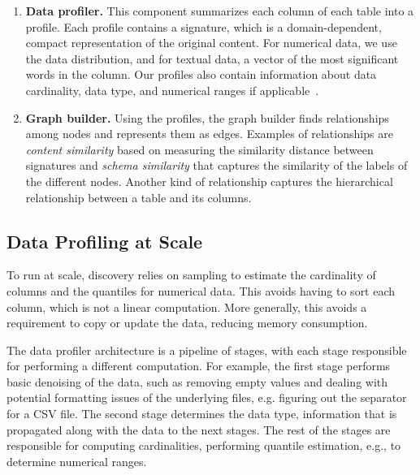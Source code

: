 \begin{enumerate}
\item {\bf Data profiler.} This component summarizes each column of each table into a profile. Each profile contains a signature, which is a domain-dependent, compact representation of the original content.
For numerical data, we use the data distribution, and for textual data,  a vector of the most significant words in the column.
Our profiles also contain information about data cardinality, data type, and numerical ranges if applicable~\cite{profiling_survey}.

\item {\bf Graph builder.} Using the profiles, the graph builder finds relationships among nodes and represents them as edges. Examples of relationships are \emph{content similarity} based on measuring the similarity distance between signatures and \emph{schema similarity} that captures the similarity of the labels of the different nodes. Another kind of relationship captures the hierarchical relationship between a table and its columns.  

\end{enumerate}


\subsection{Data Profiling at Scale}

To run at scale, discovery relies on sampling to estimate the cardinality of columns and the quantiles for numerical data. This avoids having to sort each column, which is not a linear computation.  More generally, this avoids a requirement to copy or update the data, reducing memory consumption.

The data profiler architecture is a pipeline of stages, with each stage responsible for performing a different computation. For example, the first stage performs basic denoising of the data, such as removing empty values and dealing with potential formatting issues of the underlying files, e.g. figuring out the separator for a CSV file.
The second stage determines the data type, information that is propagated along with the data to the next stages. The rest of the stages are responsible for computing cardinalities, performing quantile estimation, e.g., to determine numerical ranges.


